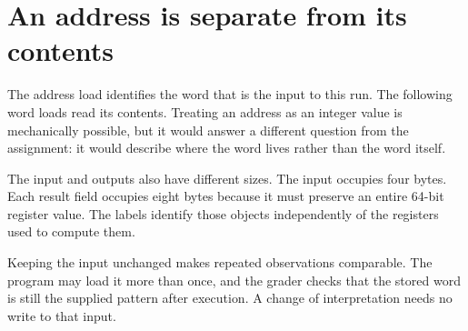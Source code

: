 \section{An address is separate from its
  contents}\label{004-bit-inspector-p02-an-address-is-separate-from-its-contents}

The address load identifies the word that is the input to this run. The
following word loads read its contents. Treating an address as an
integer value is mechanically possible, but it would answer a different
question from the assignment: it would describe where the word lives
rather than the word itself.

The input and outputs also have different sizes. The input occupies four
bytes. Each result field occupies eight bytes because it must preserve
an entire 64-bit register value. The labels identify those objects
independently of the registers used to compute them.

Keeping the input unchanged makes repeated observations comparable. The
program may load it more than once, and the grader checks that the
stored word is still the supplied pattern after execution. A change of
interpretation needs no write to that input.
